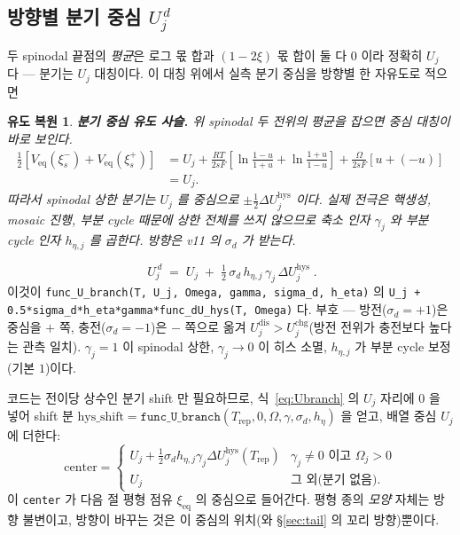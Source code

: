 \documentclass[11pt,a4paper]{article}
\newtheorem*{derivebox}{유도 복원}
\newcommand{\eq}{\mathrm{eq}}
\newcommand{\dis}{\mathrm{dis}}
\newcommand{\chg}{\mathrm{chg}}
\newcommand{\hys}{\mathrm{hys}}
\newcommand{\rep}{\mathrm{rep}}
\newcommand{\code}[1]{\texttt{#1}}
\begin{document}
\subsection{방향별 분기 중심 $U_j^{\,d}$}
두 spinodal 끝점의 \emph{평균}은 로그 몫 합과 $(1-2\xi)$ 몫 합이 둘 다 $0$ 이라 정확히 $U_j$ 다 — 분기는 $U_j$
대칭이다. 이 대칭 위에서 실측 분기 중심을 방향별 한 자유도로 적으면

\begin{derivebox}
\textbf{분기 중심 유도 사슬.} 위 spinodal 두 전위의 평균을 잡으면 중심 대칭이 바로 보인다.
\begin{align*}
\frac12[V_{\eq}(\xi_s^-)+V_{\eq}(\xi_s^+)]
&=U_j+\frac{RT}{2sF}\left[\ln\frac{1-u}{1+u}+\ln\frac{1+u}{1-u}\right]
+\frac{\Omega}{2sF}[u+(-u)]\\
&=U_j.
\end{align*}
따라서 spinodal 상한 분기는 $U_j$ 를 중심으로 $\pm\tfrac12\Delta U_j^{\hys}$ 이다. 실제 전극은 핵생성, mosaic 진행, 부분 cycle 때문에 상한 전체를 쓰지 않으므로 축소 인자 $\gamma_j$ 와 부분 cycle 인자 $h_{\eta,j}$ 를 곱한다. 방향은 v11 의 $\sigma_d$ 가 받는다.
\end{derivebox}

\begin{equation}
\boxed{\;U_j^{\,d}\;=\;U_j\;+\;\tfrac12\,\sigma_d\,h_{\eta,j}\,\gamma_j\,\Delta U_j^\hys\;.}
\label{eq:Ubranch}
\end{equation}
이것이 \code{func\_U\_branch(T, U\_j, Omega, gamma, sigma\_d, h\_eta)} 의
\code{U\_j + 0.5*sigma\_d*h\_eta*gamma*func\_dU\_hys(T, Omega)} 다. 부호 — 방전($\sigma_d=+1$)은 중심을 $+$ 쪽,
충전($\sigma_d=-1$)은 $-$ 쪽으로 옮겨 $U_j^{\dis}>U_j^{\chg}$(방전 전위가 충전보다 높다는 관측 일치). $\gamma_j=1$ 이
spinodal 상한, $\gamma_j\to0$ 이 히스 소멸, $h_{\eta,j}$ 가 부분 cycle 보정(기본 $1$)이다.

코드는 전이당 상수인 분기 shift 만 필요하므로, 식~\eqref{eq:Ubranch} 의 $U_j$ 자리에 $0$ 을 넣어 shift 분
$\mathrm{hys\_shift}=\code{func\_U\_branch}(T_\rep,0,\Omega,\gamma,\sigma_d,h_\eta)$ 을 얻고, 배열 중심 $U_j$ 에 더한다:
\begin{equation}
\mathrm{center}=
\begin{cases}
U_j+\tfrac12\sigma_d h_{\eta,j}\gamma_j\Delta U_j^\hys(T_\rep) & \gamma_j\ne0 \text{ 이고 } \Omega_j>0\\[2pt]
U_j & \text{그 외(분기 없음)}.
\end{cases}
\label{eq:center}
\end{equation}
이 \code{center} 가 다음 절 평형 점유 $\xi_\eq$ 의 중심으로 들어간다. 평형 종의 \emph{모양} 자체는 방향 불변이고,
방향이 바꾸는 것은 이 중심의 위치(와 \S\ref{sec:tail} 의 꼬리 방향)뿐이다.
\end{document}

